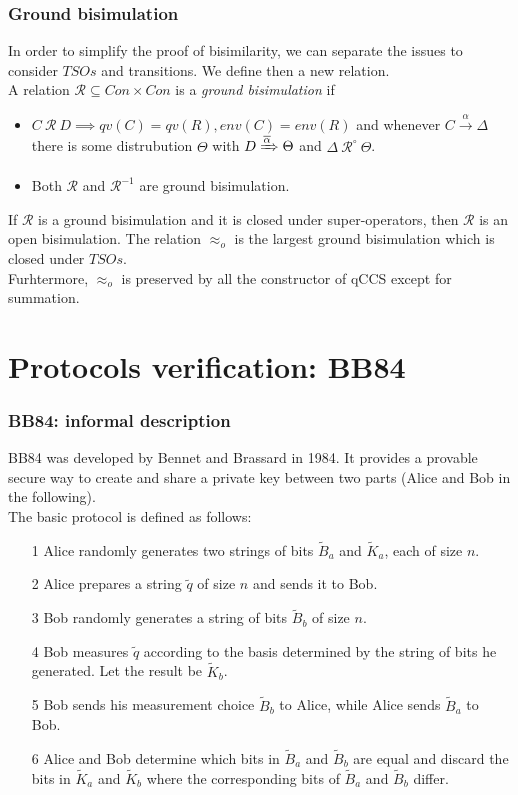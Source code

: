 \documentclass{beamer}
\begin{document}
\begin{frame}
\frametitle{Ground bisimulation}
In order to simplify the proof of bisimilarity, we can separate the issues to consider 
$TSOs$ and transitions. We define then a new relation. \\
A relation $\mathcal{R} \subseteq Con \times Con$ is a \emph{ground bisimulation} if
	\begin{itemize}
		\item $C \ \mathcal{R} \ D \implies qv(C) = qv(R), env(C) = env(R)$ and whenever 
		$C \xrightarrow\alpha \Delta$ there is some distrubution $\Theta$ with
		$D \xRightarrow{\overline{\alpha}} \Theta$ and $\Delta \ \mathcal{R}^\circ \ 
		\Theta$.
		\item Both $\mathcal{R}$ and $\mathcal{R}^{-1}$ are ground bisimulation.
	\end{itemize}
If $\mathcal{R}$ is a ground bisimulation and it is closed under super-operators, then $\mathcal{R}$ is an open bisimulation. The relation $\approx_o$ is the largest ground bisimulation which is closed under $TSOs$. \\
Furhtermore, $\approx_o$ is preserved by all the constructor of qCCS except for summation.
\end{frame}

\section{Protocols verification: BB84}

\begin{frame}
\frametitle{BB84: informal description}
BB84 was developed by Bennet and Brassard in 1984. It provides a provable secure way to create and share a private key between two parts (Alice and Bob in the following). \\
The basic protocol is defined as follows:
	\begin{itemize}
		\item[1] Alice randomly generates two strings of bits $\widetilde{B}_a$ and 
		$\widetilde{K}_a$, each of size $n$.
		\item[2] Alice prepares a string $\widetilde{q}$ of size $n$ and sends it to Bob.
		\item[3] Bob randomly generates a string of bits $\widetilde{B}_b$ of size $n$.
		\item[4] Bob measures $\widetilde{q}$ according to the basis determined by the
		string of bits he generated. Let the result be $\widetilde{K}_b$.
		\item[5] Bob sends his measurement choice $\widetilde{B}_b$ to Alice, while Alice
		sends $\widetilde{B}_a$ to Bob.
		\item[6] Alice and Bob determine which bits in $\widetilde{B}_a$ and 
		$\widetilde{B}_b$ are equal and discard the bits in $\widetilde{K}_a$ and
		$\widetilde{K}_b$ where the corresponding bits of $\widetilde{B}_a$ and 
		$\widetilde{B}_b$ differ.
	\end{itemize}
\end{frame}
\end{document}
